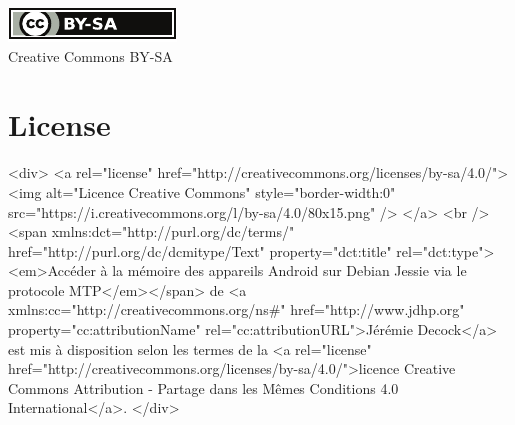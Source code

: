 \documentclass{article}
\begin{document}

\nocite{*}                    %




\ifpdf
    \vfill %
    \begin{center}
        \href{http://creativecommons.org/licenses/by-sa/4.0/}{\includegraphics[width=.15\linewidth]{fig/cc_by_sa_small}}\\
        \small{Creative Commons BY-SA}
    \end{center}
\else
    \section*{License}\label{sec:license}

    \begin{rawhtml}

        <div>
            <a rel="license" href="http://creativecommons.org/licenses/by-sa/4.0/">
                <img alt="Licence Creative Commons" style="border-width:0" src="https://i.creativecommons.org/l/by-sa/4.0/80x15.png" />
            </a>
            <br />
            <span xmlns:dct="http://purl.org/dc/terms/" href="http://purl.org/dc/dcmitype/Text" property="dct:title" rel="dct:type"><em>Accéder à la mémoire des appareils Android sur Debian Jessie via le protocole MTP</em></span> de <a xmlns:cc="http://creativecommons.org/ns#" href="http://www.jdhp.org" property="cc:attributionName" rel="cc:attributionURL">Jérémie Decock</a> est mis à disposition selon les termes de la <a rel="license" href="http://creativecommons.org/licenses/by-sa/4.0/">licence Creative Commons Attribution -  Partage dans les Mêmes Conditions 4.0 International</a>.
        </div>

    \end{rawhtml}
\fi
\end{document}
